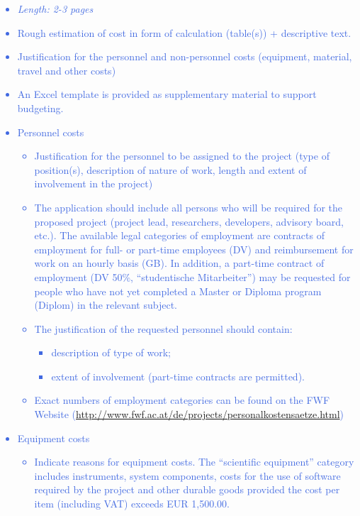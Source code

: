 \documentclass[a4paper,11pt]{article}
\providecommand*{\note}[1]{\small \textcolor{RoyalBlue}{\begin{minipage}{\textwidth}{#1}\end{minipage}}}
\begin{document}
\note{
\begin{itemize}
\item {\em Length: 2-3 pages}
\item Rough estimation of cost in form of calculation (table(s)) + descriptive text.
\item Justification for the personnel and non-personnel costs (equipment, material, travel and other costs)
\item An Excel template is provided as supplementary material to support budgeting.
\item Personnel costs
	\begin{itemize}
	\item     Justification for the personnel to be assigned to the project (type of position(s), description of nature of work, length and extent of involvement in the project)
	\item     The application should include all persons who will be required for the proposed project (project lead, researchers, developers, advisory board, etc.). The available legal categories of employment are contracts of employment for full- or part-time employees (DV) and reimbursement for work on an hourly basis (GB). In addition, a part-time contract of employment (DV 50\%, ``studentische Mitarbeiter'') may be requested for people who have not yet completed a Master or Diploma program (Diplom) in the relevant subject.
	 \item    The justification of the requested personnel should contain:
		\begin{itemize}
		\item 	        description of type of work;
		\item 		        extent of involvement (part-time contracts are permitted).
		\end{itemize}
	\item Exact numbers of employment categories can be found on the FWF Website (\href{http://www.fwf.ac.at/de/projects/personalkostensaetze.html}{http://www.fwf.ac.at/de/projects/personalkostensaetze.html})
	\end{itemize}
\item Equipment costs
	\begin{itemize}
	\item     Indicate reasons for equipment costs. The ``scientific equipment'' category includes instruments, system components, costs for the use of software required by the project and other durable goods provided the cost per item (including VAT) exceeds EUR 1,500.00.
	\end{itemize}

\end{itemize}}
\end{document}
